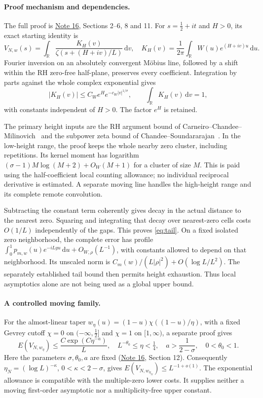 \documentclass[11pt]{article}
\newcommand{\dd}{\,\mathrm d}
\newcommand{\Nref}{\href{../notes/16_GEVREY_GLOBAL_APPROXIMATION_AND_RATE_20261020.md}{Note 16}}
\begin{document}
\paragraph{Proof mechanism and dependencies.}
The full proof is \Nref, Sections 2--6, 8 and 11.
For \(s=\frac12+it\) and \(H>0\), its exact starting identity is
\[
 V_{N,w}(s)=\int_{\mathbb R}
 \frac{K_H(v)}{\zeta(s+(H+iv)/L)}\dd v,\quad
 K_H(v)=\frac1{2\pi}\int_{\mathbb R}W(u)e^{(H+iv)u}\dd u .
\]
Fourier inversion on an absolutely convergent M\"obius line, followed
by a shift within the RH zero-free half-plane, preserves every
coefficient. Integration by parts against the whole complex
exponential gives
\[
 |K_H(v)|\le C_W e^H e^{-c_W|v|^{1/\sigma}},
 \qquad \int_{\mathbb R}K_H(v)\dd v=1 ,
\]
with constants independent of \(H>0\). The factor \(e^H\) is retained.

The primary height inputs are the RH argument bound of
Carneiro--Chandee--Milinovich~\cite{CCM} and the subpower zeta bound of
Chandee--Soundararajan~\cite{CS}. In the low-height range, the proof
keeps the whole nearby zero cluster, including repetitions. Its
kernel moment has logarithm
\((\sigma-1)M\log(M+2)+O_W(M+1)\) for a cluster of size \(M\).
This is paid using the half-coefficient local counting allowance;
no individual reciprocal derivative is estimated. A separate moving
line handles the high-height range and its complete remote convolution.

Subtracting the constant term coherently gives decay in the actual
distance to the nearest zero. Squaring and integrating that decay over
nearest-zero cells costs \(O(1/L)\) independently of the gaps.
This proves \eqref{eq:tail}. On a fixed isolated zero neighborhood,
the complete error has profile
\(\int_0^1p_{m,w}(u)e^{-iLyu}\dd u+O_{W,\rho}(L^{-1})\),
with constants allowed to depend on that neighborhood. Its unscaled
norm is \(C_m(w)/(L|\rho|^2)+O(\log L/L^2)\).
The separately established tail bound then permits height exhaustion.
Thus local asymptotics alone are not being used as a global upper bound.

\paragraph{A controlled moving family.}
For the almost-linear taper
\(w_\eta(u)=(1-u)\chi((1-u)/\eta)\), with a fixed Gevrey cutoff
\(\chi=0\) on \((-\infty,\frac12]\) and \(\chi=1\) on \([1,\infty)\),
a separate proof gives
\begin{equation}\label{eq:moving}
 E(V_{N,w_\eta})\le \frac{C\exp(C\eta^{-a})}{L},
 \quad L^{-\theta_0}\le\eta<\tfrac14,\quad
 a>\frac1{2-\sigma},\quad 0<\theta_0<1.
\end{equation}
Here the parameters \(\sigma,\theta_0,a\) are fixed
(\Nref, Section 12). Consequently
\(\eta_N=(\log L)^{-\kappa}\), \(0<\kappa<2-\sigma\),
gives \(E(V_{N,w_{\eta_N}})\le L^{-1+o(1)}\).
The exponential allowance is compatible with the multiple-zero lower
costs. It supplies neither a moving first-order asymptotic nor a
multiplicity-free upper constant.
\end{document}
